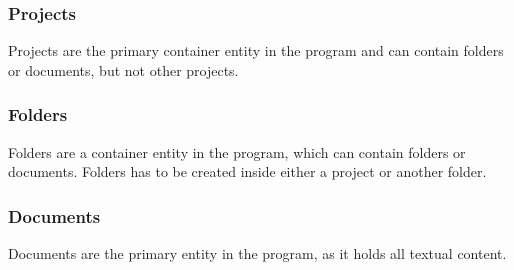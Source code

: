 \subsubsection{Projects}
Projects are the primary container entity in the program and can contain folders or documents, but not other projects.

\subsubsection{Folders}
Folders are a container entity in the program, which can contain folders or documents. Folders has to be created inside either a project or another folder.

\subsubsection{Documents}
Documents are the primary entity in the program, as it holds all textual content.